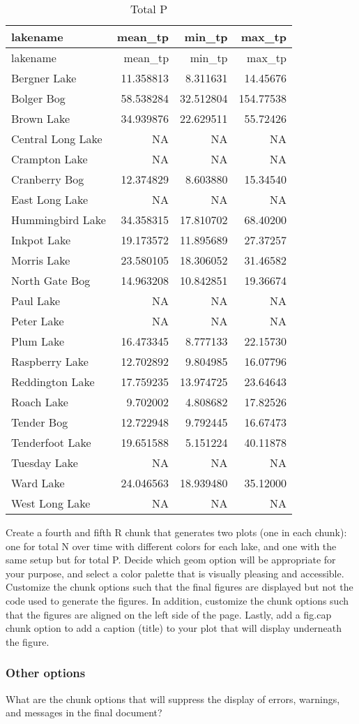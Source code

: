 \documentclass[]{article}
\begin{document}
\begin{longtable}[]{@{}lrrr@{}}
\caption{Total P}\tabularnewline
\toprule
lakename & mean\_tp & min\_tp & max\_tp\tabularnewline
\midrule
\endfirsthead
\toprule
lakename & mean\_tp & min\_tp & max\_tp\tabularnewline
\midrule
\endhead
Bergner Lake & 11.358813 & 8.311631 & 14.45676\tabularnewline
Bolger Bog & 58.538284 & 32.512804 & 154.77538\tabularnewline
Brown Lake & 34.939876 & 22.629511 & 55.72426\tabularnewline
Central Long Lake & NA & NA & NA\tabularnewline
Crampton Lake & NA & NA & NA\tabularnewline
Cranberry Bog & 12.374829 & 8.603880 & 15.34540\tabularnewline
East Long Lake & NA & NA & NA\tabularnewline
Hummingbird Lake & 34.358315 & 17.810702 & 68.40200\tabularnewline
Inkpot Lake & 19.173572 & 11.895689 & 27.37257\tabularnewline
Morris Lake & 23.580105 & 18.306052 & 31.46582\tabularnewline
North Gate Bog & 14.963208 & 10.842851 & 19.36674\tabularnewline
Paul Lake & NA & NA & NA\tabularnewline
Peter Lake & NA & NA & NA\tabularnewline
Plum Lake & 16.473345 & 8.777133 & 22.15730\tabularnewline
Raspberry Lake & 12.702892 & 9.804985 & 16.07796\tabularnewline
Reddington Lake & 17.759235 & 13.974725 & 23.64643\tabularnewline
Roach Lake & 9.702002 & 4.808682 & 17.82526\tabularnewline
Tender Bog & 12.722948 & 9.792445 & 16.67473\tabularnewline
Tenderfoot Lake & 19.651588 & 5.151224 & 40.11878\tabularnewline
Tuesday Lake & NA & NA & NA\tabularnewline
Ward Lake & 24.046563 & 18.939480 & 35.12000\tabularnewline
West Long Lake & NA & NA & NA\tabularnewline
\bottomrule
\end{longtable}

Create a fourth and fifth R chunk that generates two plots (one in each
chunk): one for total N over time with different colors for each lake,
and one with the same setup but for total P. Decide which geom option
will be appropriate for your purpose, and select a color palette that is
visually pleasing and accessible. Customize the chunk options such that
the final figures are displayed but not the code used to generate the
figures. In addition, customize the chunk options such that the figures
are aligned on the left side of the page. Lastly, add a fig.cap chunk
option to add a caption (title) to your plot that will display
underneath the figure.

\subsubsection{Other options}\label{other-options}

What are the chunk options that will suppress the display of errors,
warnings, and messages in the final document?
\end{document}
